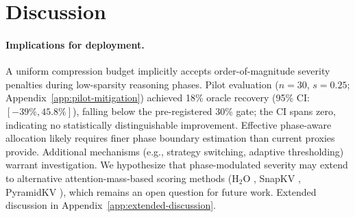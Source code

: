 \section{Discussion}
\label{sec:discussion}

\paragraph{Implications for deployment.}
A uniform compression budget implicitly accepts order-of-magnitude severity penalties during low-sparsity reasoning phases. Pilot evaluation ($n{=}30$, $s{=}0.25$; Appendix~\ref{app:pilot-mitigation}) achieved 18\% oracle recovery (95\% CI: $[-39\%, 45.8\%]$), falling below the pre-registered 30\% gate; the CI spans zero, indicating no statistically distinguishable improvement. Effective phase-aware allocation likely requires finer phase boundary estimation than current proxies provide. Additional mechanisms (e.g., strategy switching, adaptive thresholding) warrant investigation. We hypothesize that phase-modulated severity may extend to alternative attention-mass-based scoring methods (H$_2$O \cite{h2o-neurips2023}, SnapKV \cite{snapkv-neurips2024}, PyramidKV \cite{pyramidkv-colm2025}), which remains an open question for future work. Extended discussion in Appendix~\ref{app:extended-discussion}.

